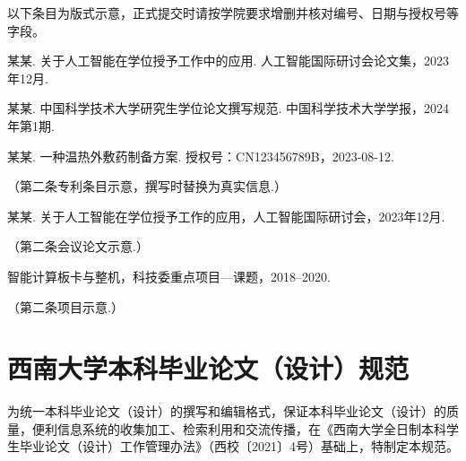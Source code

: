 \begin{publications}
以下条目为版式示意，正式提交时请按学院要求增删并核对编号、日期与授权号等字段。

\begin{swupubenum}
  \item 某某. 关于人工智能在学位授予工作中的应用. 人工智能国际研讨会论文集，2023年12月.
  \item 某某. 中国科学技术大学研究生学位论文撰写规范. 中国科学技术大学学报，2024年第1期.
\end{swupubenum}

\begin{swupubenum}
  \item 某某. 一种温热外敷药制备方案. 授权号：CN123456789B，2023-08-12.
  \item （第二条专利条目示意，撰写时替换为真实信息.）
\end{swupubenum}

\begin{swupubenum}
  \item 某某. 关于人工智能在学位授予工作的应用，人工智能国际研讨会，2023年12月.
  \item （第二条会议论文示意.）
\end{swupubenum}

\begin{swupubenum}
  \item 智能计算板卡与整机，科技委重点项目—课题，2018--2020.
  \item （第二条项目示意.）
\end{swupubenum}
\end{publications}

\appendix
\chapter{西南大学本科毕业论文（设计）规范}\label{app:swu-undergrad-spec}

\noindent 为统一本科毕业论文（设计）的撰写和编辑格式，保证本科毕业论文（设计）的质量，便利信息系统的收集加工、检索利用和交流传播，在《西南大学全日制本科学生毕业论文（设计）工作管理办法》（西校〔2021〕4号）基础上，特制定本规范。

